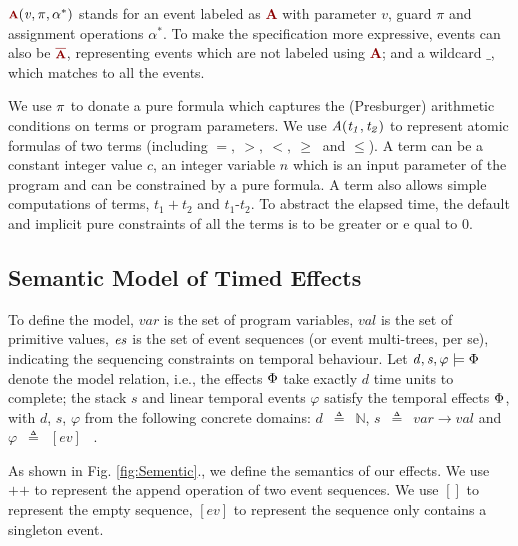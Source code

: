 \documentclass[acmsmall,10pt,review]{acmart}
\newcommand{\es}{\textcolor{black}{\ensuremath{{es}}}}
\newcommand{\effect}{\textcolor{black}{\ensuremath{\mathrm{\Phi}}}}
\newcommand\pure[1]{ \textcolor{black}{#1}}
\newcommand{\anyevent}[1]{{\textcolor{darkred}
{{\textbf{\footnotesize #1}}}}}
\newcommand{\anynotevent}[1]{{\textcolor{darkred}
{{\textbf{\footnotesize $\overline{\text{#1}}$}}}}}
\newcommand{\code}[1]{{\tt{\ensuremath{\m{#1}}}}}
\newcommand{\m}{\mathit}
\newcommand{\lappend}{\mathrel{\texttt{++}}}
\def\defeq{\ensuremath{\,\triangleq}}
\newcommand\figref[1]{Fig. \textcolor{black}{\ref{#1}}.}
\begin{document}
{\code{\anyevent{A}(v, \pi, \alpha^*)} stands for an event labeled 
as \anyevent{A} with parameter \code{v}, guard \code{\pi} and assignment operations \code{\alpha^*}. 
To make the specification more expressive, events can also be 
\code{\anynotevent{A}}, representing  events which are not 
labeled using \anyevent{A}; and a wildcard \code{\_}, which matches to all the events.



We use \code{\pure{\pi}} to donate a pure formula which captures the (Presburger) arithmetic conditions on terms or program parameters. 
We use \code{\pure{A(}{t_1, t_2}\pure{)}} to represent atomic formulas of two terms (including $  {=},
   \ {>},
   \ {<},
   \ {\geq}\ $ and $ {\leq} $).
A term can be a constant integer value \code{c}, an integer variable \code{n} which is an input parameter of the program and can be constrained by a pure formula. 
A term also allows simple computations of terms, \code{t_1{+}t_2} and \code{t_1\text{-}t_2}. To abstract the elapsed time, the default and implicit pure constraints of all the terms is to be greater or e
qual to  0. 


\subsection{Semantic Model of Timed Effects}
\label{subsec:Specification_Semantics}


To define the model, 
\code{var} is the set of program variables, 
\code{val} is the set of primitive values, 
\code{\es} is the set of event sequences (or event multi-trees, per se), indicating the sequencing constraints on temporal behaviour.
Let \code{d, s, \varphi \models \effect} denote the model relation, i.e., 
the effects \code{\effect} take exactly \code{d} time units to complete; 
the stack \code{s} and linear temporal events \code{\varphi} satisfy the 
temporal effects \code{\effect}, with \code{d}, \code{s}, \code{\varphi} 
from the following concrete domains: \code{d}  {\defeq}\  \code{\mathbb{N}}, 
\code{s}  \defeq\  \code{var {\rightarrow} val } and \code{\varphi}   \defeq\ \code{[ev]} \ .

As shown in \figref{fig:Sementic}, we define the semantics of our effects. 
We use $\lappend$ to represent the append operation of two event sequences. 
We use $[]$ to represent the empty sequence, \code{[ev]} to represent 
the sequence only contains a singleton event. 

}
\end{document}
